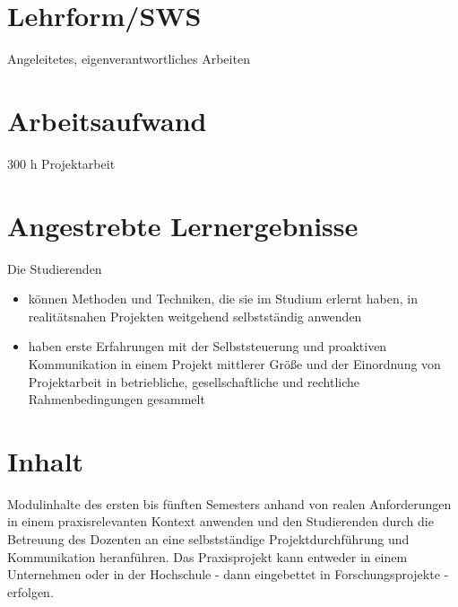 \section*{Lehrform/SWS\label{/mi-2017/modulbeschreibungen-bachelor/BA_Praxisprojektarbeit}}\label{lehrformswspathlabelmi-2017modulbeschreibungen-bachelorbaux5fpraxisprojektarbeit}

Angeleitetes, eigenverantwortliches Arbeiten

\section*{Arbeitsaufwand\label{/mi-2017/modulbeschreibungen-bachelor/BA_Praxisprojektarbeit}}\label{arbeitsaufwandpathlabelmi-2017modulbeschreibungen-bachelorbaux5fpraxisprojektarbeit}

300 h Projektarbeit

\section*{Angestrebte
Lernergebnisse\label{/mi-2017/modulbeschreibungen-bachelor/BA_Praxisprojektarbeit}}\label{angestrebte-lernergebnissepathlabelmi-2017modulbeschreibungen-bachelorbaux5fpraxisprojektarbeit}

Die Studierenden

\begin{itemize}
\tightlist
\item
  können Methoden und Techniken, die sie im Studium erlernt haben, in
  realitätsnahen Projekten weitgehend selbstständig anwenden
\item
  haben erste Erfahrungen mit der Selbststeuerung und proaktiven
  Kommunikation in einem Projekt mittlerer Größe und der Einordnung von
  Projektarbeit in betriebliche, gesellschaftliche und rechtliche
  Rahmenbedingungen gesammelt
\end{itemize}

\section*{Inhalt\label{/mi-2017/modulbeschreibungen-bachelor/BA_Praxisprojektarbeit}}\label{inhaltpathlabelmi-2017modulbeschreibungen-bachelorbaux5fpraxisprojektarbeit}

Modulinhalte des ersten bis fünften Semesters anhand von realen
Anforderungen in einem praxisrelevanten Kontext anwenden und den
Studierenden durch die Betreuung des Dozenten an eine selbstständige
Projektdurchführung und Kommunikation heranführen. Das Praxisprojekt
kann entweder in einem Unternehmen oder in der Hochschule - dann
eingebettet in Forschungsprojekte - erfolgen.

